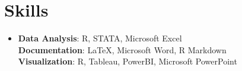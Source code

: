 \section{Skills}
 \begin{itemize}[leftmargin=0.4cm, label={}]
    \item{
     \textbf{Data Analysis}{: \small{R, STATA, Microsoft Excel}} \\
     \textbf{Documentation}{: \small{LaTeX, Microsoft Word, R Markdown}} \\
     \textbf{Visualization}{: \small{R, Tableau, PowerBI, Microsoft PowerPoint}} \\
    }
 \end{itemize}
    